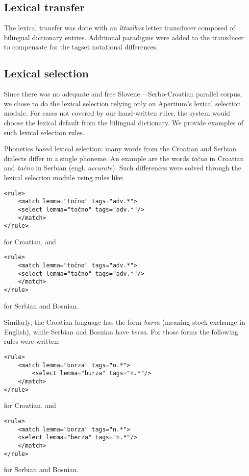 \subsection{Lexical transfer}
The lexical transfer was done with an \emph{lttoolbox} letter
transducer composed of bilingual dictionary entries. Additional
paradigms were added to the transducer to compensate for the tagset
notational differences.

\subsection{Lexical selection}

Since there was no adequate and free Slovene -- Serbo-Croatian parallel corpus, 
we chose to do the lexical selection relying only on Apertium's lexical selection module.
For cases not covered by our hand-written rules, the system would choose the lexical 
default from the bilingual dictionary.
We provide examples of such lexical selection rules.

Phonetics based lexical selection: many words from the Croatian and Serbian dialects differ in a single phoneme.
An example are the words \emph{točno} in Croatian and \emph{tačno} in Serbian (engl. \emph{accurate}).
Such differences were solved through the lexical selection module using rules like:

{\small
\begin{Verbatim}
<rule>
    <match lemma="točno" tags="adv.*">
	<select lemma="točno" tags="adv.*"/>
    </match>
</rule>
\end{Verbatim}
}
for Croatian, and
{\small
\begin{Verbatim}
<rule>
    <match lemma="točno" tags="adv.*">
	<select lemma="tačno" tags="adv.*"/>
    </match>
</rule>
\end{Verbatim}
}
for Serbian and Bosnian.

Similarly, the Croatian language has the form \emph{burza} (meaning stock exchange in English), while Serbian and Bosnian have \emph{berza}. 
For those forms the following rules were written:

{\small
\begin{Verbatim}
<rule>
    <match lemma="borza" tags="n.*">
        <select lemma="burza" tags="n.*"/>
    </match>
</rule>
\end{Verbatim}
}
for Croatian, and 
{\small
\begin{Verbatim}
<rule>
    <match lemma="borza" tags="n.*">
	<select lemma="berza" tags="n.*"/>
    </match>
</rule>

\end{Verbatim}
}
for Serbian and Bosnian.

